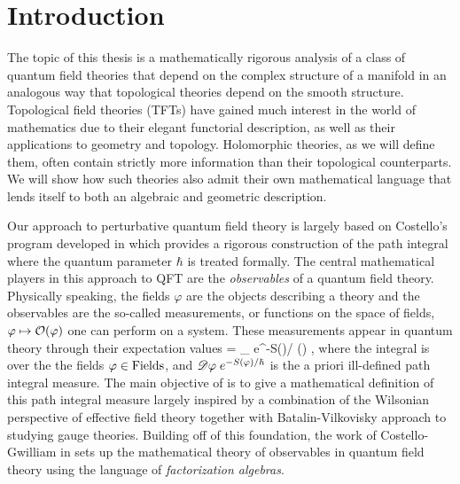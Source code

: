 \chapter{Introduction}

The topic of this thesis is a mathematically rigorous analysis of a class of quantum field theories that depend on the complex structure of a manifold in an analogous way that topological theories depend on the smooth structure. 
Topological field theories (TFTs) have gained much interest in the world of mathematics due to their elegant functorial description, as well as their applications to geometry and topology. 
Holomorphic theories, as we will define them, often contain strictly more information than their topological counterparts.
We will show how such theories also admit their own mathematical language that lends itself to both an algebraic and geometric description. %

Our approach to perturbative quantum field theory is largely based on Costello's program developed in \cite{CostelloRenormalization} which provides a rigorous construction of the path integral where the quantum parameter $\hbar$ is treated formally. 
The central mathematical players in this approach to QFT are the {\em observables} of a quantum field theory. 
Physically speaking, the fields $\varphi$ are the objects describing a theory and the observables are the so-called measurements, or functions on the space of fields, $\varphi \mapsto \mathcal O(\varphi)$ one can perform on a system.
These measurements appear in quantum theory through their expectation values
\ben
\<\cO\> = \int_{\varphi {}} \sD \varphi \; e^{-S(\varphi)/ \hbar} \;  \cO(\varphi) ,
\een
where the integral is over the the fields $\varphi \in {\rm Fields}$, and $\mathscr D \varphi \; e^{-S(\varphi)/ \hbar}$ is the a priori ill-defined path integral measure.
The main objective of \cite{CostelloRenormalization} is to give a mathematical definition of this path integral measure largely inspired by a combination of the Wilsonian perspective of effective field theory together with Batalin-Vilkovisky approach to studying gauge theories.
Building off of this foundation, the work of Costello-Gwilliam in \cite{CG1,CG2} sets up the mathematical theory of observables in quantum field theory using the language of {\em factorization algebras}. 

